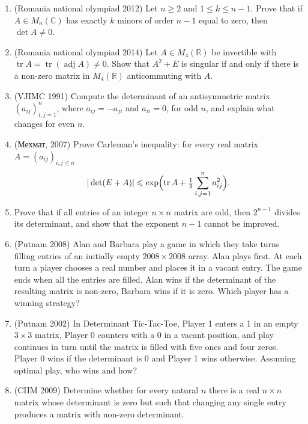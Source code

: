 \documentclass[11pt,a4paper]{article}
\DeclareMathOperator{\tr}{tr}
\DeclareMathOperator{\adj}{adj}
\begin{document}
\begin{enumerate}
\item (Romania national olympiad 2012) Let $n\geqslant2$ and $1\leqslant k\leqslant n-1$. Prove
that if $A\in M_n(\mathbb C)$ has exactly $k$ minors of order $n-1$ equal to zero, then
$\det A\ne0$.

\item (Romania national olympiad 2014) Let $A\in M_4(\mathbb R)$ be invertible with
$\tr A=\tr(\adj A)\ne0$. Show that $A^2+E$ is singular if and only if there is a non-zero matrix
in $M_4(\mathbb R)$ anticommuting with $A$.

\item (VJIMC 1991) Compute the determinant of an antisymmetric matrix $(a_{ij})_{i,j=1}^n$,
where $a_{ij}=-a_{ji}$ and $a_{ii}=0$, for odd $n$, and explain what changes for even $n$.

\item (\foreignlanguage{russian}{Мехмат}, 2007) Prove Carleman's inequality: for every
real matrix~$A=(a_{ij})_{i,j\leqslant n}$
\[
|\det(E+A)|\leqslant\exp\Bigl(\tr A+\tfrac12\sum_{i,j=1}^na_{ij}^2\Bigr).
\]

\item Prove that if all entries of an integer $n\times n$ matrix are odd, then $2^{n-1}$ divides
its determinant, and show that the exponent $n-1$ cannot be improved.

\item (Putnam 2008) Alan and Barbara play a game in which they take turns filling entries of an
initially empty $2008\times2008$ array. Alan plays first. At each turn a player chooses a real
number and places it in a vacant entry. The game ends when all the entries are filled. Alan wins
if the determinant of the resulting matrix is non-zero, Barbara wins if it is zero. Which player
has a winning strategy?

\item (Putnam 2002) In Determinant Tic-Tac-Toe, Player 1 enters a 1 in an empty $3\times3$
matrix, Player 0 counters with a 0 in a vacant position, and play continues in turn until the
matrix is filled with five ones and four zeros. Player 0 wins if the determinant is 0 and Player 1
wins otherwise. Assuming optimal play, who wins and how?

\item (CIIM 2009) Determine whether for every natural $n$ there is a real $n\times n$ matrix whose
determinant is zero but such that changing any single entry produces a matrix with non-zero
determinant.
\end{enumerate}
\end{document}
